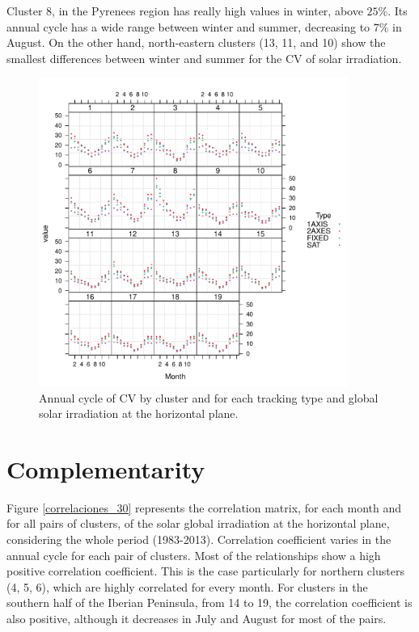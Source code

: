 \begin{subappendices}
Cluster 8, in the Pyrenees region has really high values in winter, above $25\%$. Its annual cycle has a wide range between winter and summer, decreasing to $7\%$ in August. On the other hand, north-eastern clusters (13, 11, and 10) show the smallest differences between winter and summer for the CV of solar irradiation.


\begin{figure}
\includegraphics[width=0.9\textwidth]{figs/capitulo5/ciclo_anual_byCluster_all}
\caption{Annual cycle of CV by cluster and for each tracking type and global solar irradiation at the horizontal plane.}
\label{cicloAnualCV_all}
\end{figure}


\section{Complementarity}


Figure \ref{correlaciones_30} represents the correlation matrix, for each month and for all pairs of clusters, of the solar global irradiation at the horizontal plane, considering the whole period (1983-2013). Correlation coefficient varies in the annual cycle for each pair of clusters. Most of the relationships show a high positive correlation coefficient. This is the case particularly for northern clusters (4, 5, 6), which are highly correlated for every month. For clusters in the southern half of the Iberian Peninsula, from 14 to 19, the correlation coefficient is also positive, although it decreases in July and August for most of the pairs. 


\end{subappendices}
